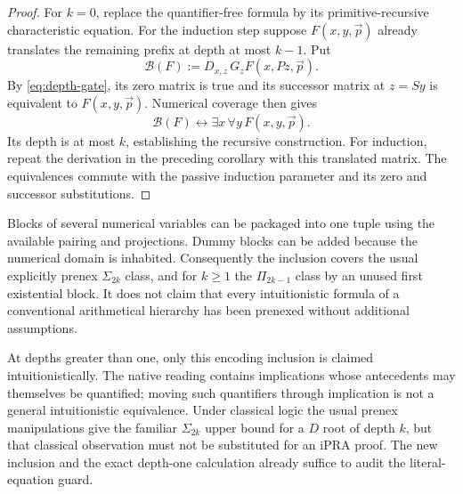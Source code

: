 \begin{proof}
For $k=0$, replace the quantifier-free formula by its primitive-recursive
characteristic equation. For the induction step suppose $F(x,y,\vec p)$
already translates the remaining prefix at depth at most $k-1$. Put
\[
             \mathcal B(F)
       :=D_{x,z}\,G_zF(x,Pz,\vec p).
\]
By \eqref{eq:depth-gate}, its zero matrix is true and its successor
matrix at $z=Sy$ is equivalent to $F(x,y,\vec p)$. Numerical coverage
then gives
\[
             \mathcal B(F)
       \leftrightarrow\exists x\,\forall y\,F(x,y,\vec p).
\]
Its depth is at most $k$, establishing the recursive construction.
For induction, repeat the derivation in the preceding corollary with
this translated matrix. The equivalences commute with the passive
induction parameter and its zero and successor substitutions.
\end{proof}

Blocks of several numerical variables can be packaged into one tuple
using the available pairing and projections. Dummy blocks can be added
because the numerical domain is inhabited. Consequently the inclusion
covers the usual explicitly prenex $\Sigma_{2k}$ class, and for $k\ge1$ the
$\Pi_{2k-1}$ class by an unused first existential block. It does not
claim that every intuitionistic formula of a conventional arithmetical
hierarchy has been prenexed without additional assumptions.

At depths greater than one, only this encoding inclusion is claimed
intuitionistically. The native reading contains implications whose
antecedents may themselves be quantified; moving such quantifiers
through implication is not a general intuitionistic equivalence.
Under classical logic the usual prenex manipulations give the familiar
$\Sigma_{2k}$ upper bound for a $D$ root of depth $k$, but that classical
observation must not be substituted for an iPRA proof. The new inclusion
and the exact depth-one calculation already suffice to audit the
literal-equation guard.

